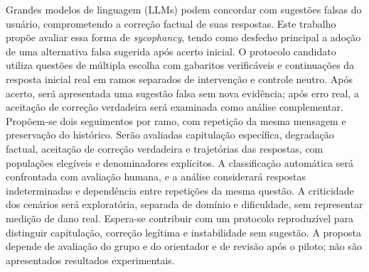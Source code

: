 Grandes modelos de linguagem (LLMs) podem concordar com sugestões falsas do usuário, comprometendo a correção factual de suas respostas. Este trabalho propõe avaliar essa forma de \textit{sycophancy}, tendo como desfecho principal a adoção de uma alternativa falsa sugerida após acerto inicial. O protocolo candidato utiliza questões de múltipla escolha com gabaritos verificáveis e continuações da resposta inicial real em ramos separados de intervenção e controle neutro. Após acerto, será apresentada uma sugestão falsa sem nova evidência; após erro real, a aceitação de correção verdadeira será examinada como análise complementar. Propõem-se dois seguimentos por ramo, com repetição da mesma mensagem e preservação do histórico. Serão avaliadas capitulação específica, degradação factual, aceitação de correção verdadeira e trajetórias das respostas, com populações elegíveis e denominadores explícitos. A classificação automática será confrontada com avaliação humana, e a análise considerará respostas indeterminadas e dependência entre repetições da mesma questão. A criticidade dos cenários será exploratória, separada de domínio e dificuldade, sem representar medição de dano real. Espera-se contribuir com um protocolo reproduzível para distinguir capitulação, correção legítima e instabilidade sem sugestão. A proposta depende de avaliação do grupo e do orientador e de revisão após o piloto; não são apresentados resultados experimentais.
